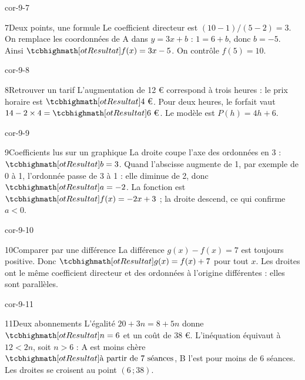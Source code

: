 \begin{blocLivre}{cor-9-7}\begin{corrige}{7}{Deux points, une formule}
Le coefficient directeur est $(10-1)/(5-2)=3$. On remplace les coordonnées de A dans $y=3x+b$ : $1=6+b$, donc $b=-5$. Ainsi $\res{f(x)=3x-5}$. On contrôle $f(5)=10$.
\label{fig-cor-9-7}
\end{corrige}\end{blocLivre}
\begin{blocLivre}{cor-9-8}\begin{corrige}{8}{Retrouver un tarif}
L’augmentation de 12 € correspond à trois heures : le prix horaire est $\res{4\text{ €}}$. Pour deux heures, le forfait vaut $14-2\times4=\res{6\text{ €}}$. Le modèle est $P(h)=4h+6$.
\end{corrige}\end{blocLivre}
\begin{blocLivre}{cor-9-9}\begin{corrige}{9}{Coefficients lus sur un graphique}
La droite coupe l’axe des ordonnées en 3 : $\res{b=3}$. Quand l’abscisse augmente de 1, par exemple de 0 à 1, l’ordonnée passe de 3 à 1 : elle diminue de 2, donc $\res{a=-2}$. La fonction est $\res{f(x)=-2x+3}$ ; la droite descend, ce qui confirme $a<0$.
\label{fig-cor-9-9}
\end{corrige}\end{blocLivre}
\begin{blocLivre}{cor-9-10}\begin{corrige}{10}{Comparer par une différence}
La différence $g(x)-f(x)=7$ est toujours positive. Donc $\res{g(x)=f(x)+7}$ pour tout $x$. Les droites ont le même coefficient directeur et des ordonnées à l’origine différentes : elles sont parallèles.
\label{fig-cor-9-10}
\end{corrige}\end{blocLivre}
\begin{blocLivre}{cor-9-11}\begin{corrige}{11}{Deux abonnements}
L’égalité $20+3n=8+5n$ donne $\res{n=6}$ et un coût de 38 €. L’inéquation équivaut à $12<2n$, soit $n>6$ : A est moins chère $\res{\text{à partir de 7 séances}}$, B l’est pour moins de 6 séances. Les droites se croisent au point $(6\,;38)$.
\label{fig-cor-9-11}
\end{corrige}\end{blocLivre}
